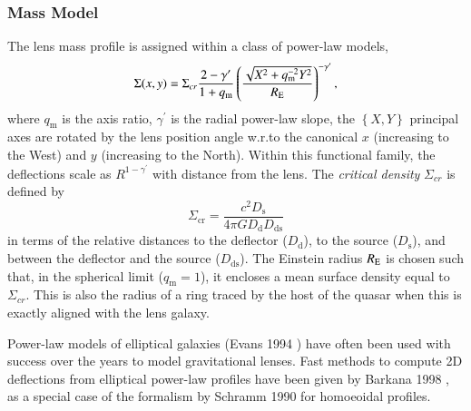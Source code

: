 \documentclass[a4paper,11pt]{article}
\def\qm{q_\mathrm{m}}
\begin{document}
\subsubsection{Mass Model}

The lens mass profile is assigned within a class of power-law models,
%
\begin{equation}
\Sigma(x,y)=\Sigma_{cr}\frac{2-\gamma^{\prime}}{1+\qm}\left(\frac{\sqrt{ X^{2}+\qm^{-2}Y^{2}}}{R_{\rm E}}\right)^{-\gamma^{\prime}},
\end{equation}
%
where $q_\mathrm{m}$ is the axis ratio, $\gamma^{\prime}$ is the radial power-law
slope, the $\left\{X,Y\right\}$ principal axes are rotated by the lens position
angle w.r.to the canonical $x$ (increasing to the West) and $y$
(increasing to the North).  Within this functional family, the deflections scale as $R^{1-\gamma^{\prime}}$ with distance from the lens.
The \textit{critical density} $\Sigma_{cr}$ is defined by
%
\begin{equation}
\Sigma_{\mathrm{cr}} = \frac{c^{2}D_{\mathrm{s}}}{4\pi G D_{\mathrm{d}} D_{\mathrm{ds}}}
\end{equation}
%
in terms of the relative distances to the deflector ($D_{\mathrm{d}}$), to the
source ($D_{\mathrm{s}}$), and between the deflector and the source
($D_{\mathrm{ds}}$). The Einstein radius $R_{\rm{E}}$ is chosen such that, in the spherical limit ($\qm=1$),
 it encloses a mean surface density equal to $\Sigma_{cr}.$ This is also the radius of a ring traced by the host of
 the quasar when this is exactly aligned with the lens galaxy.

 Power-law models of elliptical galaxies (Evans 1994 \cite{1994MNRAS.267..333E}) have often been used with
success over the years to model gravitational lenses.
 Fast methods to compute 2D deflections from elliptical power-law profiles have been given by Barkana 1998
\cite{1998ApJ...502..531B}, as a special case of the formalism by Schramm 1990 \cite{1990A&A...231...19S} for homoeoidal profiles.
%
%
\end{document}
